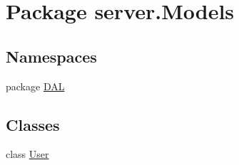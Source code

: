 \hypertarget{namespaceserver_1_1Models}{\section{Package server.\-Models}
\label{namespaceserver_1_1Models}
}
\subsection*{Namespaces}
\begin{DoxyCompactItemize}
\item 
package \hyperlink{namespaceserver_1_1Models_1_1DAL}{D\-A\-L}
\end{DoxyCompactItemize}
\subsection*{Classes}
\begin{DoxyCompactItemize}
\item 
class \hyperlink{classserver_1_1Models_1_1User}{User}
\end{DoxyCompactItemize}

